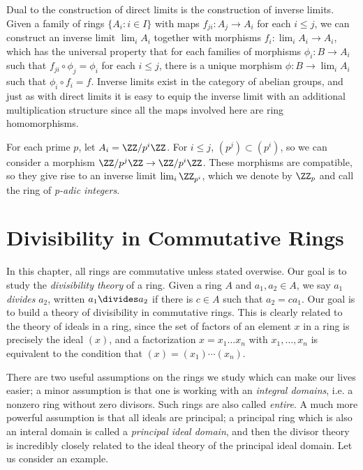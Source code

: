 Dual to the construction of direct limits is the construction of inverse limits. Given a family of rings $\{ A_i : i \in I \}$ with maps $f_{ji}: A_j \to A_i$ for each $i \leq j$, we can construct an inverse limit $\lim_i A_i$ together with morphisms $f_i: \lim_i A_i \to A_i$, which has the universal property that for each families of morphisms $\phi_i: B \to A_i$ such that $f_{ji} \circ \phi_j = \phi_i$ for each $i \leq j$, there is a unique morphism $\phi: B \to \lim_i A_i$ such that $\phi_i \circ f_i = f$. Inverse limits exist in the category of abelian groups, and just as with direct limits it is easy to equip the inverse limit with an additional multiplication structure since all the maps involved here are ring homomorphisms.

\begin{example}
    For each prime $p$, let $A_i = \ZZ/p^i \ZZ$. For $i \leq j$, $(p^j) \subset (p^i)$, so we can consider a morphism $\ZZ/p^j\ZZ \to \ZZ/p^i\ZZ$. These morphisms are compatible, so they give rise to an inverse limit $\lim_i \ZZ_{p^i}$, which we denote by $\ZZ_p$ and call the ring of \emph{p-adic integers}.
\end{example}



\chapter{Divisibility in Commutative Rings}

In this chapter, all rings are commutative unless stated overwise. Our goal is to study the \emph{divisibility theory} of a ring. Given a ring $A$ and $a_1,a_2 \in A$, we say $a_1$ \emph{divides} $a_2$, written $a_1 \divides a_2$ if there is $c \in A$ such that $a_2 = ca_1$. Our goal is to build a theory of divisibility in commutative rings. This is clearly related to the theory of ideals in a ring, since the set of factors of an element $x$ in a ring is precisely the ideal $(x)$, and a factorization $x = x_1 \dots x_n$ with $x_1, \dots, x_n$ is equivalent to the condition that $(x) = (x_1) \cdots (x_n)$.

There are two useful assumptions on the rings we study which can make our lives easier; a minor assumption is that one is working with an \emph{integral domains}, i.e. a nonzero ring without zero divisors. Such rings are also called \emph{entire}. A much more powerful assumption is that all ideals are principal; a principal ring which is also an interal domain is called a \emph{principal ideal domain}, and then the divisor theory is incredibly closely related to the ideal theory of the principal ideal domain. Let us consider an example.

